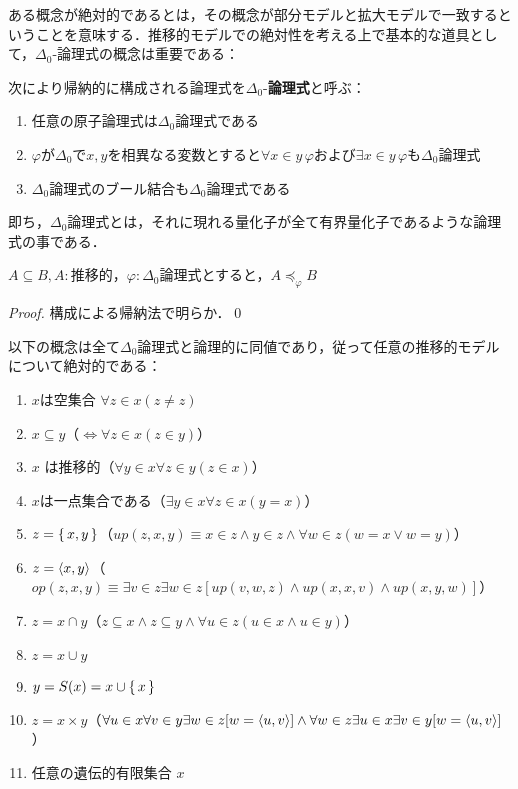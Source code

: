 \documentclass[xelatex,a4j,jadriver=standard]{bxjsarticle}
\begin{document}
ある概念が絶対的であるとは，その概念が部分モデルと拡大モデルで一致するということを意味する．推移的モデルでの絶対性を考える上で基本的な道具として，$\Delta_0$-論理式の概念は重要である：

\begin{definition}
 次により帰納的に構成される論理式を$\Delta_0$-{\bfseries 論理式}と呼ぶ：

 \begin{enumerate}[label=(\alph*)]
  \item 任意の原子論理式は$\Delta_0$論理式である
  \item $\varphi$が$\Delta_0$で$x, y$を相異なる変数とすると$\forall x \in y\, \varphi$および$\exists x \in y\, \varphi$も$\Delta_0$論理式
  \item $\Delta_0$論理式のブール結合も$\Delta_0$論理式である
 \end{enumerate}

 即ち，$\Delta_0$論理式とは，それに現れる量化子が全て有界量化子であるような論理式の事である．
\end{definition}

\begin{theorem}
 $A \subseteq B, A:$推移的，$\varphi: \Delta_0$論理式とすると，$A \preccurlyeq_\varphi B$
\end{theorem}
\begin{proof}
 構成による帰納法で明らか．\qed
\end{proof}

\begin{theorem}
 以下の概念は全て$\Delta_0$論理式と論理的に同値であり，従って任意の推移的モデルについて絶対的である：
 \begin{enumerate}
  \item $x$は空集合 $\forall z \in x (z \neq z)$
  \item $x \subseteq y $（$\Leftrightarrow \forall z \in x (z \in y)$）
  \item $x$ は推移的（$\forall y \in x \forall z \in y (z \in x)$）
  \item $x$は一点集合である（$\exists y \in x \forall z \in x (y = x)$）
  \item $z = \set{x, y}$（$up(z,x,y) \equiv x \in z \wedge y \in z \wedge \forall w \in z (w = x \vee w = y)$）
  \item $z = \braket{x, y}$（$op(z,x,y) \equiv \exists v \in z \exists w \in z [up(v,w,z) \wedge up(x,x,v) \wedge up(x,y,w)]$）
  \item $z = x \cap y$（$z \subseteq x \wedge z \subseteq y \wedge \forall u \in z(u \in x \wedge u \in y)$）
  \item $z = x \cup y$
  \item $y = S(x) = x \cup \set{x}$
  \item $z = x \times y$（$\forall u \in x \forall v \in y \exists w \in z [w = \braket{u,v}] \wedge \forall w \in z \exists u \in x \exists v \in y [w = \braket{u,v}]$）
  \item 任意の遺伝的有限集合 $x$
 \end{enumerate}
\end{theorem}
\end{document}
